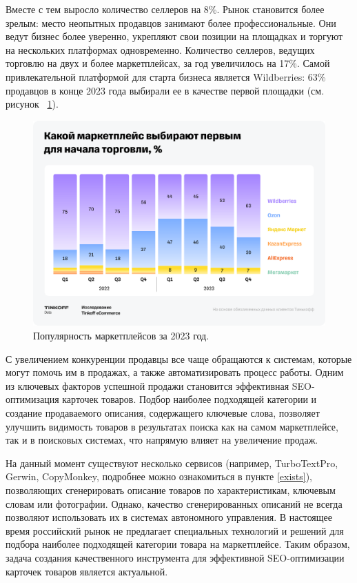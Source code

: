 \documentclass[a4paper,12pt]{extarticle}
\begin{document}
Вместе с тем выросло количество селлеров на 8\%. Рынок становится более зрелым: место неопытных продавцов занимают более профессиональные. Они ведут бизнес более уверенно, укрепляют свои позиции на площадках и торгуют на нескольких платформах одновременно. Количество селлеров, ведущих торговлю на двух и более маркетплейсах, за год увеличилось на 17\%. Самой привлекательной платформой для старта бизнеса является Wildberries: 63\% продавцов в конце 2023 года выбирали ее в качестве первой площадки (см. рисунок ~\ref{fig:marketplaces-top}).

\begin{figure}[hbtp]
	\centering
	\includegraphics[scale=0.3]{marketplaces-top.png}
	\caption{Популярность маркетплейсов за 2023 год.}
	\label{fig:marketplaces-top}
\end{figure} 

С увеличением конкуренции продавцы все чаще обращаются к системам, которые могут помочь им в продажах, а также автоматизировать процесс работы. Одним из ключевых факторов успешной продажи становится эффективная SEO-оптимизация карточек товаров. Подбор наиболее подходящей категории и создание продаваемого описания, содержащего ключевые слова, позволяет улучшить видимость товаров в результатах поиска как на самом маркетплейсе, так и в поисковых системах, что напрямую влияет на увеличение продаж.

На данный момент существуют несколько сервисов (например, TurboTextPro, Gerwin, CopyMonkey, подробнее можно ознакомиться в пункте \ref{exists}), позволяющих сгенерировать описание товаров по характеристикам, ключевым словам или фотографии. Однако, качество сгенерированных описаний не всегда позволяют использовать их в системах автономного управления. В настоящее время российский рынок не предлагает специальных технологий и решений для подбора наиболее подходящей категории товара на маркетплейсе. Таким образом, задача создания качественного инструмента для эффективной SEO-оптимизации карточек товаров является актуальной. 
\end{document}
